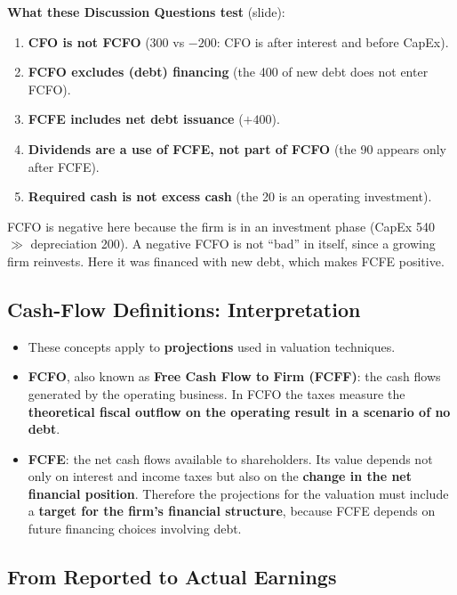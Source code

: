 \textbf{What these Discussion Questions test} (slide):
\begin{enumerate}
  \item \textbf{CFO is not FCFO} (300 vs $-200$: CFO is after interest and before CapEx).
  \item \textbf{FCFO excludes (debt) financing} (the 400 of new debt does not enter FCFO).
  \item \textbf{FCFE includes net debt issuance} ($+400$).
  \item \textbf{Dividends are a use of FCFE, not part of FCFO} (the 90 appears only after FCFE).
  \item \textbf{Required cash is not excess cash} (the 20 is an operating investment).
\end{enumerate}

\begin{addbox}
FCFO is negative here because the firm is in an investment phase (CapEx 540 $\gg$ depreciation 200). A negative FCFO is not ``bad'' in itself, since a growing firm reinvests. Here it was financed with new debt, which makes FCFE positive.
\end{addbox}

\subsection{Cash-Flow Definitions: Interpretation}

\begin{itemize}
  \item These concepts apply to \textbf{projections} used in valuation techniques.
  \item \textbf{FCFO}, also known as \textbf{Free Cash Flow to Firm (FCFF)}: the cash flows generated by the operating business. In FCFO the taxes measure the \textbf{theoretical fiscal outflow on the operating result in a scenario of no debt}.
  \item \textbf{FCFE}: the net cash flows available to shareholders. Its value depends not only on interest and income taxes but also on the \textbf{change in the net financial position}. Therefore the projections for the valuation must include a \textbf{target for the firm's financial structure}, because FCFE depends on future financing choices involving debt.
\end{itemize}

\subsection{From Reported to Actual Earnings}

